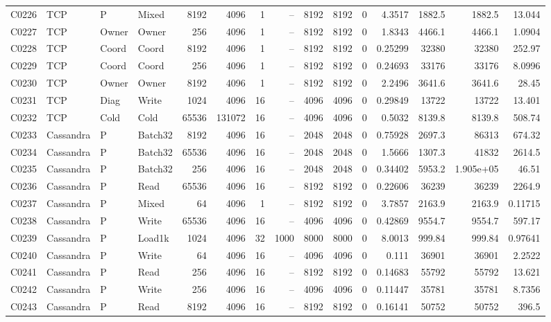 \begin{landscape}
\begin{longtable}{llllrrrrrrrrrrr}
C0226 & TCP & P & Mixed & 8192 & 4096 & 1 & -- & 8192 & 8192 & 0 & 4.3517 & 1882.5 & 1882.5 & 13.044\\
C0227 & TCP & Owner & Owner & 256 & 4096 & 1 & -- & 8192 & 8192 & 0 & 1.8343 & 4466.1 & 4466.1 & 1.0904\\
C0228 & TCP & Coord & Coord & 8192 & 4096 & 1 & -- & 8192 & 8192 & 0 & 0.25299 & 32380 & 32380 & 252.97\\
C0229 & TCP & Coord & Coord & 256 & 4096 & 1 & -- & 8192 & 8192 & 0 & 0.24693 & 33176 & 33176 & 8.0996\\
C0230 & TCP & Owner & Owner & 8192 & 4096 & 1 & -- & 8192 & 8192 & 0 & 2.2496 & 3641.6 & 3641.6 & 28.45\\
C0231 & TCP & Diag & Write & 1024 & 4096 & 16 & -- & 4096 & 4096 & 0 & 0.29849 & 13722 & 13722 & 13.401\\
C0232 & TCP & Cold & Cold & 65536 & 131072 & 16 & -- & 4096 & 4096 & 0 & 0.5032 & 8139.8 & 8139.8 & 508.74\\
C0233 & Cassandra & P & Batch32 & 8192 & 4096 & 16 & -- & 2048 & 2048 & 0 & 0.75928 & 2697.3 & 86313 & 674.32\\
C0234 & Cassandra & P & Batch32 & 65536 & 4096 & 16 & -- & 2048 & 2048 & 0 & 1.5666 & 1307.3 & 41832 & 2614.5\\
C0235 & Cassandra & P & Batch32 & 256 & 4096 & 16 & -- & 2048 & 2048 & 0 & 0.34402 & 5953.2 & 1.905e+05 & 46.51\\
C0236 & Cassandra & P & Read & 65536 & 4096 & 16 & -- & 8192 & 8192 & 0 & 0.22606 & 36239 & 36239 & 2264.9\\
C0237 & Cassandra & P & Mixed & 64 & 4096 & 1 & -- & 8192 & 8192 & 0 & 3.7857 & 2163.9 & 2163.9 & 0.11715\\
C0238 & Cassandra & P & Write & 65536 & 4096 & 16 & -- & 4096 & 4096 & 0 & 0.42869 & 9554.7 & 9554.7 & 597.17\\
C0239 & Cassandra & P & Load1k & 1024 & 4096 & 32 & 1000 & 8000 & 8000 & 0 & 8.0013 & 999.84 & 999.84 & 0.97641\\
C0240 & Cassandra & P & Write & 64 & 4096 & 16 & -- & 4096 & 4096 & 0 & 0.111 & 36901 & 36901 & 2.2522\\
C0241 & Cassandra & P & Read & 256 & 4096 & 16 & -- & 8192 & 8192 & 0 & 0.14683 & 55792 & 55792 & 13.621\\
C0242 & Cassandra & P & Write & 256 & 4096 & 16 & -- & 4096 & 4096 & 0 & 0.11447 & 35781 & 35781 & 8.7356\\
C0243 & Cassandra & P & Read & 8192 & 4096 & 16 & -- & 8192 & 8192 & 0 & 0.16141 & 50752 & 50752 & 396.5\\

\end{longtable}
\end{landscape}
